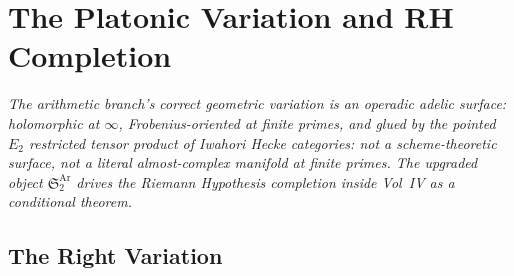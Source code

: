 \chapter{The Platonic Variation and RH Completion}
\label{v4-arith:platonic-rh-completion}

\emph{The arithmetic branch's correct geometric variation is an
operadic adelic surface: holomorphic at \(\infty\), Frobenius-oriented
at finite primes, and glued by the pointed \(E_{2}\) restricted tensor
product of Iwahori Hecke categories: not a scheme-theoretic surface,
not a literal almost-complex manifold at finite primes. The upgraded
object \(\mathfrak{S}^{\mathrm{Ar}}_{2}\) drives the Riemann Hypothesis
completion inside Vol~IV as a conditional theorem.}

\section{The Right Variation}
\label{v4-arith:platonic:right-variation}

